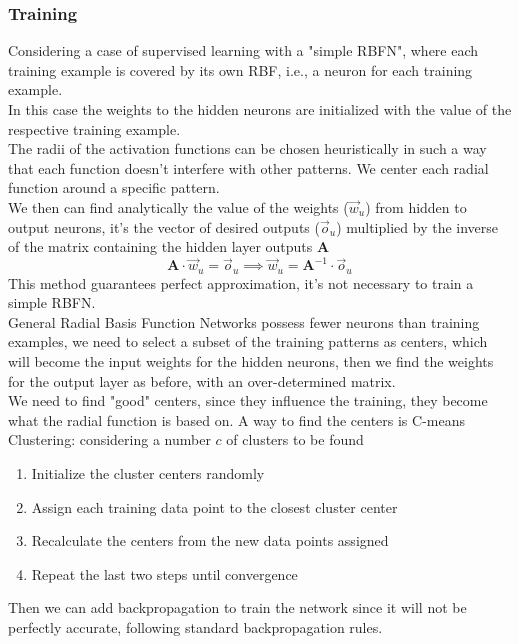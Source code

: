 \subsubsection{Training}
Considering a case of supervised learning with a "simple RBFN", where each training example is covered by its own RBF, i.e., a neuron for each training example. \\
In this case the weights to the hidden neurons are initialized with the value of the respective training example. \\
The radii of the activation functions can be chosen heuristically in such a way that each function doesn't interfere with other patterns. We center each radial function around a specific pattern.\\
We then can find analytically the value of the weights ($\vec{w}_u$) from hidden to output neurons, it's the vector of desired outputs ($\vec{o}_u$) multiplied by the inverse of the matrix containing the hidden layer outputs $\bm{A}$
$$ \bm{A} \cdot \vec{w}_u = \vec{o}_u \implies \vec{w}_u = \bm{A}^{-1} \cdot \vec{o}_u $$
This method guarantees perfect approximation, it's not necessary to train a simple RBFN.\\

General Radial Basis Function Networks possess fewer neurons than training examples, we need to select a subset of the training patterns as centers, which will become the input weights for the hidden neurons, then we find the weights for the output layer as before, with an over-determined matrix.\\

\label{point:c-means}
We need to find "good" centers, since they influence the training, they become what the radial function is based on. A way to find the centers is C-means Clustering: considering  a number $c$ of clusters to be found
\begin{enumerate}
	\item Initialize the cluster centers randomly
	\item Assign each training data point to the closest cluster center
	\item Recalculate the centers from the new data points assigned 
	\item Repeat the last two steps until convergence
\end{enumerate}

Then we can add backpropagation to train the network since it will not be perfectly accurate, following standard backpropagation rules. \\

